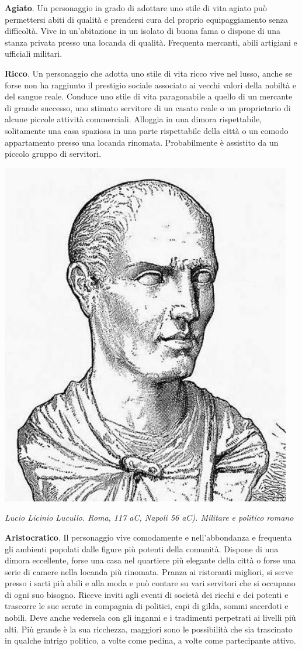\documentclass[a4paper,twoside,openany]{book}
\begin{document}
\begin{multicols}{2}
\textbf{Agiato}. Un personaggio in grado di adottare uno stile di vita agiato può permettersi abiti di qualità e prendersi cura del proprio equipaggiamento senza difficoltà. Vive in un'abitazione in un isolato di buona fama o dispone di una stanza privata presso una locanda di qualità. Frequenta mercanti, abili artigiani e ufficiali militari.

\textbf{Ricco}. Un personaggio che adotta uno stile di vita ricco vive nel lusso, anche se forse non ha raggiunto il prestigio sociale associato ai vecchi valori della nobiltà e del sangue reale. Conduce uno stile di vita paragonabile a quello di un mercante di grande successo, uno stimato servitore di un casato reale o un proprietario di alcune piccole attività commerciali. Alloggia in una dimora rispettabile, solitamente una casa spaziosa in una parte rispettabile della città o un comodo appartamento presso una locanda rinomata. Probabilmente è assistito da un piccolo gruppo di servitori.


\begin{center}
\includegraphics[width=0.6\linewidth]{immagini/lucullo.png}

\emph{Lucio Licinio Lucullo. Roma, 117 aC, Napoli 56 aC). Militare e politico romano}
\end{center}


\textbf{Aristocratico}. Il personaggio vive comodamente e nell'abbondanza e frequenta gli ambienti popolati dalle figure più potenti della comunità. Dispone di una dimora eccellente, forse una casa nel quartiere più elegante della città o forse una serie di camere nella locanda più rinomata. Pranza ai ristoranti migliori, si serve presso i sarti più abili e alla moda e può contare su vari servitori che si occupano di ogni suo bisogno. Riceve inviti agli eventi di società dei ricchi e dei potenti e trascorre le sue serate in compagnia di politici, capi di gilda, sommi sacerdoti e nobili. Deve anche vedersela con gli inganni e i tradimenti perpetrati ai livelli più alti. Più grande è la sua ricchezza, maggiori sono le possibilità che sia trascinato in qualche intrigo politico, a volte come pedina, a volte come partecipante attivo.

\end{multicols}
\end{document}
